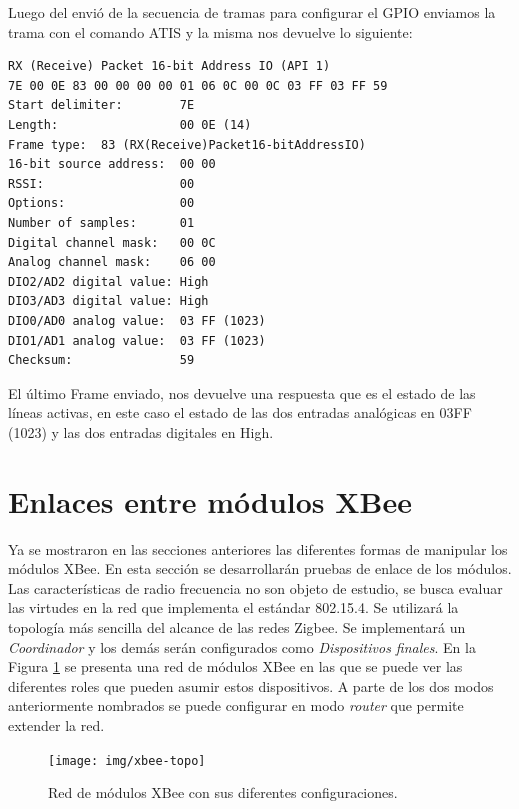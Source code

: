\documentclass[11pt,oneside,spanish,a4paper]{article}
\begin{document}
Luego del envió de la secuencia de tramas para configurar el GPIO enviamos la trama con el comando ATIS y la misma nos devuelve lo siguiente:
\begin{lstlisting}[emph={RX,(,Receive,),Packet,16,-,bit,Address,IO,(API, 1),Start,delimiter:,Length:,Frame, type:,16-bit, source, address:, RSSI:,Options:,Number, of, samples:,Digital, channel, mask:,Analog ,channel mask: ,DIO2/AD2, digital, value: ,DIO3/AD3, DIO0/AD0, analog}, emphstyle={\color{black}}, label=code:apiEjempl-id]
RX (Receive) Packet 16-bit Address IO (API 1)
7E 00 0E 83 00 00 00 00 01 06 0C 00 0C 03 FF 03 FF 59
Start delimiter:        7E
Length:                 00 0E (14)
Frame type:  83 (RX(Receive)Packet16-bitAddressIO)
16-bit source address:  00 00
RSSI:                   00
Options:                00
Number of samples:      01
Digital channel mask:   00 0C
Analog channel mask:    06 00
DIO2/AD2 digital value: High
DIO3/AD3 digital value: High
DIO0/AD0 analog value:  03 FF (1023)
DIO1/AD1 analog value:  03 FF (1023)
Checksum:               59
\end{lstlisting} 
El último Frame enviado, nos devuelve una respuesta que es el estado
de las líneas activas, en este caso el estado de las dos entradas
analógicas en 03FF (1023) y las dos entradas digitales en High.



\section{Enlaces entre módulos XBee}
\label{sec:enlace}

Ya se mostraron en las secciones anteriores las diferentes formas de
manipular los módulos XBee. En esta sección se desarrollarán pruebas
de enlace de los módulos. Las características de radio frecuencia no
son objeto de estudio, se busca evaluar las virtudes en la red que
implementa el estándar 802.15.4. Se utilizará la topología más
sencilla del alcance de las redes Zigbee. Se implementará un
\emph{Coordinador} y los demás serán configurados como
\emph{Dispositivos finales}. En la Figura \ref{fig:xbee-red} se presenta
una red de módulos XBee en las que se puede ver las diferentes
roles que pueden asumir estos dispositivos. A parte de los dos modos
anteriormente nombrados se puede configurar en modo \emph{router} que
permite extender la red. 

\begin{figure}[h]
  \centering
  \texttt{[image: img/xbee-topo]}
  \caption{Red de módulos XBee con sus diferentes configuraciones.}
  \label{fig:xbee-red}
\end{figure}
\end{document}

